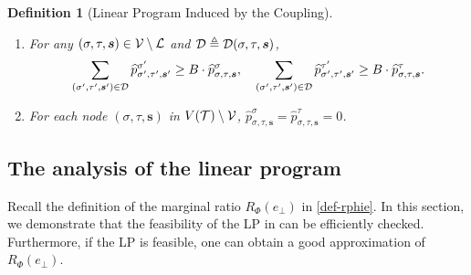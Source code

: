 \documentclass[11pt]{article}
\newtheorem{definition}[theorem]{Definition}
\newcommand{\seqS}{\boldsymbol{s}}
\begin{document}
\begin{definition}[Linear Program Induced by the Coupling]
\begin{enumerate}
            \begin{align}\label{eqn-hat-ratio}
                 \frac{ \mu(\tau)}{ \mu(\sigma)}\cdot r^-\cdot {\widehat{p}^{\tau}_{\sigma,\tau, \seqS}}\leq {\widehat{p}^{\sigma}_{\sigma,\tau, \seqS}}\leq  \frac{ \mu(\tau)}{ \mu(\sigma)}\cdot  r^+ \cdot{\widehat{p}^{\tau}_{\sigma,\tau, \seqS}}.
            \end{align}\label{item-forth-LP}
        \item For any $(\sigma,\tau, \seqS)\in \+V\setminus \+L$ and $\+D \triangleq \+D(\sigma,\tau, \seqS)$,
           \begin{align}\label{eqn-hat-error-bound}
               \sum_{(\sigma',\tau',\seqS')\in \+D}\widehat{p}^{\sigma'}_{\sigma',\tau', \seqS'} \geq  B \cdot \widehat{p}^{\sigma}_{\sigma,\tau, \seqS}, \quad \sum_{(\sigma',\tau',\seqS')\in \+D}\widehat{p}^{\tau'}_{\sigma',\tau',\seqS'}\geq  B \cdot \widehat{p}^{\tau}_{\sigma,\tau,\seqS}.
           \end{align}\label{item-fifth-LP}
        \item  For each node $(\sigma, \tau, \seqS)$ in $V(\mathcal{T})\setminus \mathcal{V}$, $ \widehat{p}^{\sigma}_{\sigma,\tau, \seqS}= \widehat{p}^{\tau}_{\sigma,\tau, \seqS}=0$. \label{item-sixth-LP}
    \end{enumerate}
\end{definition}


\subsection{The analysis of the linear program}
Recall the definition of the marginal ratio $R_{\Phi}(e_\bot)$ in \eqref{def-rphie}. In this section, 
we demonstrate that the feasibility of the LP in  can be efficiently checked. Furthermore, if the LP is feasible, one can obtain a good approximation of $R_{\Phi}(e_\bot)$.
\end{document}
